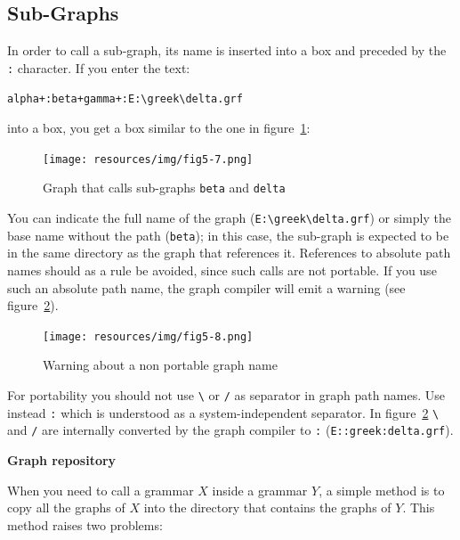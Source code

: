 \subsection{Sub-Graphs}
\label{section-subgraphs}
\index{\verbc{:}}
In order to call a sub-graph, its name is inserted into a box and preceded by the
\verb+:+ character. If you enter the text:

\bigskip
\verb$alpha+:beta+gamma+:E:\greek\delta.grf$

\bigskip
\noindent into a box, you get a box similar to the one in
figure~\ref{fig-subgraph-call}:

\medskip
\begin{figure}[!ht]
\begin{center}
\texttt{[image: resources/img/fig5-7.png]}
\caption{Graph that calls sub-graphs \texttt{beta} and
\texttt{delta}\label{fig-subgraph-call}}
\end{center}
\end{figure}

\noindent You can indicate the full name of the graph
(\verb$E:\greek\delta.grf$) or simply the base name without the path (\verb$beta$); 
in this case, the sub-graph is expected to be in the same directory as the graph that references
it. References to absolute path names should as a rule be avoided, since such
calls are not portable. If you use such an absolute path name, the graph compiler
will emit a warning (see figure~\ref{fig-warning-absolute-graph-name}).

\begin{figure}[!ht]
\begin{center}
\texttt{[image: resources/img/fig5-8.png]}
\caption{Warning about a non portable graph
name\label{fig-warning-absolute-graph-name}}
\end{center}
\end{figure}


\bigskip
\noindent For portability you should not use \verb+\+ or \verb+/+ as separator
in graph path names. Use instead \verb+:+ which is understood as a
system-independent separator. In figure~\ref{fig-warning-absolute-graph-name}
\verb+\+ and \verb+/+ are internally converted by the graph compiler to \verb+:+
(\verb+E::greek:delta.grf+).



\bigskip
\noindent \textbf{Graph repository}
\label{section-repository}

\bigskip
\noindent When you need to call a grammar $X$ inside a grammar $Y$, a simple
method is to copy all the graphs of $X$ into the directory that contains the
graphs of $Y$. This method raises two problems:

